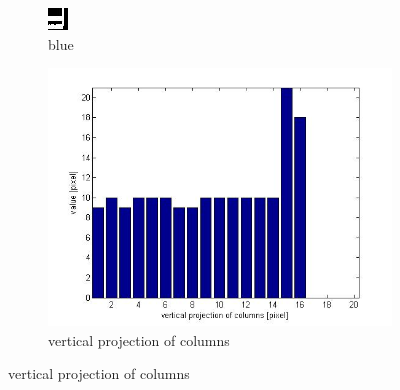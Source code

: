 \begin{figure}
\begin{subfigure}[t]{0.1\textwidth}
        \includegraphics[width=\textwidth]{3b.jpg}
        \caption{blue}
  \end{subfigure}
    \begin{subfigure}[c]{0.4\textwidth}
        \includegraphics[width=\textwidth]{3c.jpg}
        \caption{vertical projection of columns}
  \end{subfigure}
  

\end{figure}
